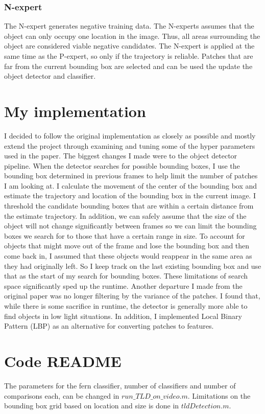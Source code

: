 \documentclass[10pt,twocolumn,letterpaper]{article}
\begin{document}
\subsubsection{N-expert}
The N-expert generates negative training data. The N-experts assumes that the object can only occupy one location in the image. Thus, all areas surrounding the object are considered viable negative candidates. The N-expert is applied at the same time as the P-expert, so only if the trajectory is reliable. Patches that are far from the current bounding box are selected and can be used the update the object detector and classifier.
\section{My implementation}
I decided to follow the original implementation as closely as possible and mostly extend the project through examining and tuning some of the hyper parameters used in the paper. The biggest changes I made were to the object detector pipeline. When the detector searches for possible bounding boxes, I use the bounding box determined in previous frames to help limit the number of patches I am looking at. I calculate the movement of the center of the bounding box and estimate the trajectory and location of the bounding box in the current image. I threshold the candidate bounding boxes that are within a certain distance from the estimate trajectory. In addition, we can safely assume that the size of the object will not change significantly between frames so we can limit the bounding boxes we search for to those that have a certain range in size. To account for objects that might move out of the frame and lose the bounding box and then come back in, I assumed that these objects would reappear in the same area as they had originally left. So I keep track on the last existing bounding box and use that as the start of my search for bounding boxes. These limitations of search space significantly sped up the runtime. Another departure I made from the original paper was no longer filtering by the variance of the patches. I found that, while there is some sacrifice in runtime, the detector is generally more able to find objects in low light situations. In addition, I implemented Local Binary Pattern (LBP) as an alternative for converting patches to features.
\section{Code README}
The parameters for the fern classifier, number of classifiers and number of comparisons each, can be changed in $run\_TLD\_on\_video.m$. Limitations on the bounding box grid based on location and size is done in $tldDetection.m$. 
\end{document}
